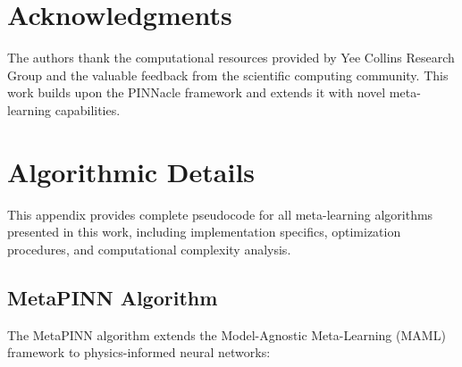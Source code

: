 \documentclass[review]{elsarticle}
\begin{document}
\section*{Acknowledgments}

The authors thank the computational resources provided by Yee Collins Research Group and the valuable feedback from the scientific computing community. This work builds upon the PINNacle framework and extends it with novel meta-learning capabilities.



\newpage
\appendix

\section{Algorithmic Details}
\label{appendix:algorithms}

This appendix provides complete pseudocode for all meta-learning algorithms presented in this work, including implementation specifics, optimization procedures, and computational complexity analysis.

\subsection{MetaPINN Algorithm}

The MetaPINN algorithm extends the Model-Agnostic Meta-Learning (MAML) framework to physics-informed neural networks:
\end{document}
